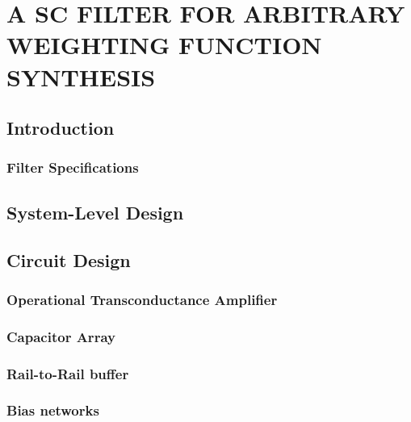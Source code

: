 \chapter{A SC FILTER FOR ARBITRARY WEIGHTING FUNCTION SYNTHESIS}
\label{chapter:introduction}
\section{Introduction}
\subsection{Filter Specifications}
\section{System-Level Design}
\section{Circuit Design}
\subsection{Operational Transconductance Amplifier}
\subsection{Capacitor Array}
\subsection{Rail-to-Rail buffer}
\subsection{Bias networks}